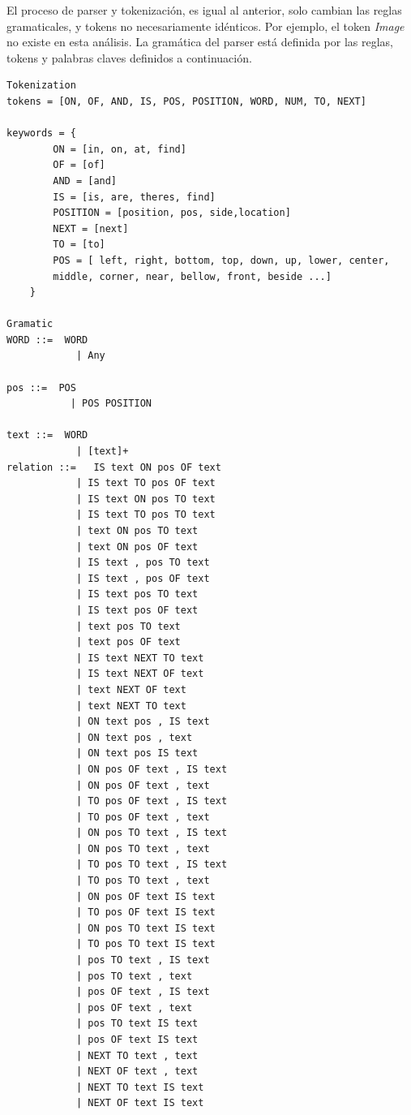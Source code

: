 El proceso de parser y tokenizaci\'on, es igual al anterior, solo cambian las reglas gramaticales, y tokens no necesariamente id\'enticos. Por ejemplo, el token \textit{Image} no existe en esta an\'alisis. La gram\'atica del parser est\'a definida por las reglas, tokens y palabras claves definidos a continuaci\'on.
\begin{verbatim}
Tokenization
tokens = [ON, OF, AND, IS, POS, POSITION, WORD, NUM, TO, NEXT]

keywords = {
        ON = [in, on, at, find]
        OF = [of]
        AND = [and]
        IS = [is, are, theres, find]
        POSITION = [position, pos, side,location]
        NEXT = [next]
        TO = [to]
        POS = [ left, right, bottom, top, down, up, lower, center,
        middle, corner, near, bellow, front, beside ...]
    }

Gramatic    
WORD ::=  WORD
            | Any
    
pos ::=  POS
           | POS POSITION 

text ::=  WORD
            | [text]+
relation ::=   IS text ON pos OF text
            | IS text TO pos OF text
            | IS text ON pos TO text
            | IS text TO pos TO text
            | text ON pos TO text
            | text ON pos OF text
            | IS text , pos TO text
            | IS text , pos OF text
            | IS text pos TO text
            | IS text pos OF text
            | text pos TO text
            | text pos OF text
            | IS text NEXT TO text
            | IS text NEXT OF text
            | text NEXT OF text
            | text NEXT TO text
            | ON text pos , IS text
            | ON text pos , text
            | ON text pos IS text
            | ON pos OF text , IS text
            | ON pos OF text , text
            | TO pos OF text , IS text
            | TO pos OF text , text
            | ON pos TO text , IS text
            | ON pos TO text , text
            | TO pos TO text , IS text
            | TO pos TO text , text
            | ON pos OF text IS text
            | TO pos OF text IS text
            | ON pos TO text IS text
            | TO pos TO text IS text
            | pos TO text , IS text
            | pos TO text , text
            | pos OF text , IS text
            | pos OF text , text
            | pos TO text IS text
            | pos OF text IS text
            | NEXT TO text , text
            | NEXT OF text , text
            | NEXT TO text IS text
            | NEXT OF text IS text
\end{verbatim}


